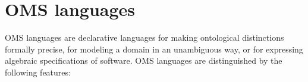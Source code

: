 \documentclass[10pt,fleqn,%
\ifpretendfinal
final%
\else
draft%
\fi,
]{scrreprt}
\newcommand*{\IS}{OMG Specification\xspace}
\newcommand{\clauserefname}{clause}
\newcommand{\cref}[1]{\clauserefname~\ref{#1}}
\begin{document}
%
%
%
%
%


\section{OMS languages}
 OMS languages are declarative languages for making ontological distinctions formally precise, for modeling a domain in an unambiguous way, or for expressing algebraic specifications of software.   OMS languages are distinguished by the following features:
\end{document}

